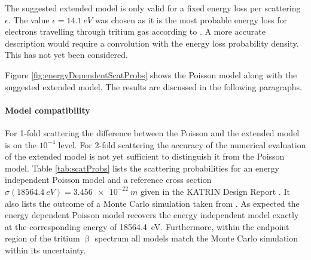 The suggested extended model is only valid for a fixed energy loss per scattering $\epsilon$. The value $\epsilon=\SI{14.1}{eV}$ was chosen as it is the most probable energy loss for electrons travelling through tritium gas according to \cite{Aseev2000}. A more accurate description would require a convolution with the energy loss probability density. This has not yet been considered.

Figure \ref{fig:energyDependentScatProbs} shows the Poisson model along with the suggested extended model. The results are discussed in the following paragraphs.


\paragraph{Model compatibility}
 For 1-fold scattering the difference between the Poisson and the extended model is on the $10^{-4}$ level. For 2-fold scattering the accuracy of the numerical evaluation of the extended model is not yet sufficient to distinguish it from the Poisson model. Table \ref{tab:scatProbs} lists the scattering probabilities for an energy independent Poisson model and a reference cross section $\sigma(\SI{18564.4}{eV})=\SI{3.456e-22}{m}$ given in the KATRIN Design Report \cite{Angrik:2005ep}. It also lists the outcome of a Monte Carlo simulation taken from \cite{Groh2015}. As expected the energy dependent Poisson model recovers the energy independent model exactly at the corresponding energy of \SI{18564.4}{eV}. Furthermore, within the endpoint region of the tritium $\upbeta$ spectrum all models match the Monte Carlo simulation within its uncertainty.

